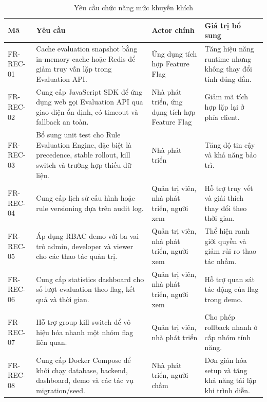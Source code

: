 \begin{table}[H]
    \centering
    \caption{Yêu cầu chức năng mức khuyến khích}
    \label{tab:recommended-functional-requirements}
    \begin{tabular}{p{} p{} p{} p{}}
        \toprule
        \textbf{Mã} & \textbf{Yêu cầu} & \textbf{Actor chính} & \textbf{Giá trị bổ sung} \\
        \midrule
        FR-REC-01 & Cache evaluation snapshot bằng in-memory cache hoặc Redis để giảm truy vấn lặp trong Evaluation API. & Ứng dụng tích hợp Feature Flag & Tăng hiệu năng runtime nhưng không thay đổi tính đúng đắn. \\
        FR-REC-02 & Cung cấp JavaScript SDK để ứng dụng web gọi Evaluation API qua giao diện ổn định, có timeout và fallback an toàn. & Nhà phát triển, ứng dụng tích hợp Feature Flag & Giảm mã tích hợp lặp lại ở phía client. \\
        FR-REC-03 & Bổ sung unit test cho Rule Evaluation Engine, đặc biệt là precedence, stable rollout, kill switch và trường hợp thiếu dữ liệu. & Nhà phát triển & Tăng độ tin cậy và khả năng bảo trì. \\
        FR-REC-04 & Cung cấp lịch sử cấu hình hoặc rule versioning dựa trên audit log. & Quản trị viên, nhà phát triển, người xem & Hỗ trợ truy vết và giải thích thay đổi theo thời gian. \\
        FR-REC-05 & Áp dụng RBAC demo với ba vai trò admin, developer và viewer cho các thao tác quản trị. & Quản trị viên, nhà phát triển, người xem & Thể hiện ranh giới quyền và giảm rủi ro thao tác nhầm. \\
        FR-REC-06 & Cung cấp statistics dashboard cho số lượt evaluation theo flag, kết quả và thời gian. & Quản trị viên, nhà phát triển, người xem & Hỗ trợ quan sát tác động của flag trong demo. \\
        FR-REC-07 & Hỗ trợ group kill switch để vô hiệu hóa nhanh một nhóm flag liên quan. & Quản trị viên, nhà phát triển & Cho phép rollback nhanh ở cấp nhóm tính năng. \\
        FR-REC-08 & Cung cấp Docker Compose để khởi chạy database, backend, dashboard, demo và các tác vụ migration/seed. & Nhà phát triển, người chấm & Đơn giản hóa setup và tăng khả năng tái lập khi trình diễn. \\
        \bottomrule
    \end{tabular}
\end{table}

